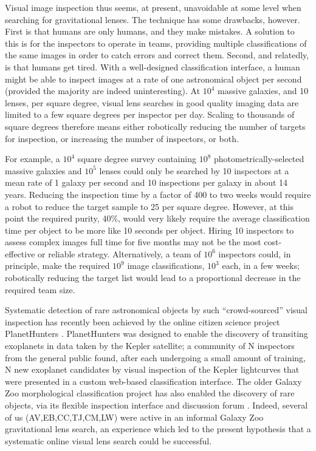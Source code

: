 \documentclass[useAMS,usenatbib,a4paper]{mn2e}
\begin{document}
Visual image inspection thus seems, at present, unavoidable at some level when
searching for gravitational lenses. The technique has some drawbacks, however.
First is that humans are only humans, and they make mistakes. A solution to
this is for the inspectors to operate in teams, providing multiple
classifications of the same images in order to catch errors and correct them.
Second, and relatedly, is that humans get tired. With a well-designed
classification interface, a human might be able to inspect images at a rate of
one astronomical object per second (provided the majority are indeed
uninteresting). At $10^4$ massive galaxies, and 10 lenses, per square degree,
visual lens searches in good quality imaging data are limited to a few square
degrees per inspector per day. Scaling to thousands of square degrees
therefore means either robotically reducing the number of targets for
inspection, or increasing the number of inspectors, or both. 

For example, a $10^4$ square degree survey containing $10^8$
photometrically-selected massive galaxies and $10^5$ lenses could only be
searched by 10 inspectors at a mean rate of 1 galaxy per second and 10
inspections per galaxy in about 14 years. Reducing the inspection time by a
factor of 400 to two weeks would require a robot to reduce the target sample
to 25 per square degree. However, at this point the required purity, 40\%,
would very likely require the average classification time per object to be
more like 10 seconds per object. Hiring 10 inspectors to assess complex images
full time for five months may not be the most cost-effective or
reliable strategy. Alternatively, a team of $10^6$ inspectors could, in
principle, make the required $10^9$ image classifications, $10^3$ each, in a
few weeks; robotically reducing the target list would lead to a proportional
decrease in the required team size.

Systematic detection of rare astronomical objects by such ``crowd-sourced''
visual inspection has recently been achieved by the online citizen science
project PlanetHunters \citep{SchwambEtal2012}. PlanetHunters was designed to
enable the discovery of transiting exoplanets in data taken by the Kepler
satellite; a community of N inspectors from the general public found, after
each undergoing a small amount of training, N new exoplanet candidates by
visual inspection of the Kepler lightcurves that were presented in a custom
web-based classification interface. The older Galaxy Zoo morphological
classification project \citep{LintottEtal2008} has also enabled the discovery
of rare objects, via its flexible inspection interface and discussion forum
\citep{LintottEtal2009}. Indeed, several of us (AV,EB,CC,TJ,CM,LW) were active
in an informal Galaxy Zoo gravitational lens search, an experience which led
to the present hypothesis that a systematic online visual lens search could be
successful. 
\end{document}
